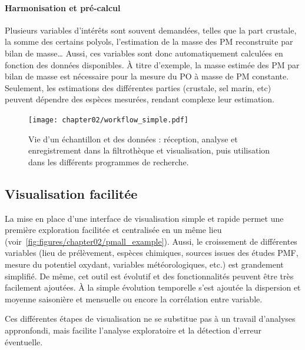 \paragraph{Harmonisation et pré-calcul}%
\label{par:harmonisation_et_pré_calcul}

Plusieurs variables d'intérêts sont souvent demandées, telles que la part crustale, la
somme des certains polyols, l'estimation de la masse des PM reconstruite par bilan de
masse… Aussi, ces variables sont donc automatiquement calculées en fonction des données
disponibles. À titre d'exemple, la masse estimée des PM par bilan de masse est nécessaire
pour la mesure du PO à masse de PM constante. Seulement, les estimations des différentes
parties (crustale, sel marin, etc) peuvent dépendre des espèces mesurées, rendant complexe
leur estimation.

\begin{landscape}
\begin{figure}[ht]
    \centering
    \texttt{[image: chapter02/workflow\_simple.pdf]}
    \caption{Vie d'un échantillon et des données : réception, analyse et enregistrement
        dans la filtrothèque et visualisation, puis utilisation dans les différents
        programmes de recherche.}%
    \label{fig:bdd}
\end{figure}
\end{landscape}

\subsection{Visualisation facilitée}%
\label{sub:visualisation_facilité}

La mise en place d'une interface de visualisation simple et rapide permet une première
exploration facilitée et centralisée en un même lieu
(voir~\ref{fig:figures/chapter02/pmall_example}). Aussi, le croissement de différentes
variables (lieu de prélèvement, espèces chimiques, sources issues des études PMF, mesure
du potentiel oxydant, variables météorologiques, etc.) est grandement simplifié.  De même,
cet outil est évolutif et des fonctionnalités peuvent être très facilement ajoutées. À la
simple évolution temporelle s'est ajoutée la dispersion et moyenne saisonière et mensuelle
ou encore la corrélation entre variable.

Ces différentes étapes de visualisation ne se substitue pas à un travail d'analyses
appronfondi, mais facilite l'analyse exploratoire et la détection d'erreur éventuelle.


